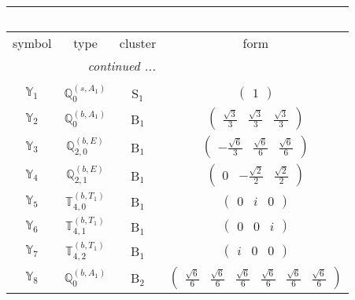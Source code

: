 \documentclass[fleqn,10pt,landscape]{article}
\begin{document}
\begin{itemize}
\begin{center}
\begin{longtable}{c|c|c|c}
\multicolumn{3}{l}{\tablename\ \thetable{}} \\
 \hline \hline
symbol & type & cluster & form \\ \hline \endhead

 \hline \hline
\multicolumn{3}{r}{\footnotesize\it continued ...} \\ \endfoot

 \hline \hline
\multicolumn{3}{r}{} \\ \endlastfoot

$ \mathbb{Y}_{1} $ & $\mathbb{Q}_{0}^{(s,A_{1})}$ & S$_{1}$ & $\begin{pmatrix} 1 \end{pmatrix}$ \\ \hline
$ \mathbb{Y}_{2} $ & $\mathbb{Q}_{0}^{(b,A_{1})}$ & B$_{1}$ & $\begin{pmatrix} \frac{\sqrt{3}}{3} & \frac{\sqrt{3}}{3} & \frac{\sqrt{3}}{3} \end{pmatrix}$ \\
$ \mathbb{Y}_{3} $ & $\mathbb{Q}_{2,0}^{(b,E)}$ & B$_{1}$ & $\begin{pmatrix} - \frac{\sqrt{6}}{3} & \frac{\sqrt{6}}{6} & \frac{\sqrt{6}}{6} \end{pmatrix}$ \\
$ \mathbb{Y}_{4} $ & $\mathbb{Q}_{2,1}^{(b,E)}$ & B$_{1}$ & $\begin{pmatrix} 0 & - \frac{\sqrt{2}}{2} & \frac{\sqrt{2}}{2} \end{pmatrix}$ \\
$ \mathbb{Y}_{5} $ & $\mathbb{T}_{4,0}^{(b,T_{1})}$ & B$_{1}$ & $\begin{pmatrix} 0 & i & 0 \end{pmatrix}$ \\
$ \mathbb{Y}_{6} $ & $\mathbb{T}_{4,1}^{(b,T_{1})}$ & B$_{1}$ & $\begin{pmatrix} 0 & 0 & i \end{pmatrix}$ \\
$ \mathbb{Y}_{7} $ & $\mathbb{T}_{4,2}^{(b,T_{1})}$ & B$_{1}$ & $\begin{pmatrix} i & 0 & 0 \end{pmatrix}$ \\ \hline
$ \mathbb{Y}_{8} $ & $\mathbb{Q}_{0}^{(b,A_{1})}$ & B$_{2}$ & $\begin{pmatrix} \frac{\sqrt{6}}{6} & \frac{\sqrt{6}}{6} & \frac{\sqrt{6}}{6} & \frac{\sqrt{6}}{6} & \frac{\sqrt{6}}{6} & \frac{\sqrt{6}}{6} \end{pmatrix}$ \\

\end{longtable}
\end{center}
\end{itemize}
\end{document}
